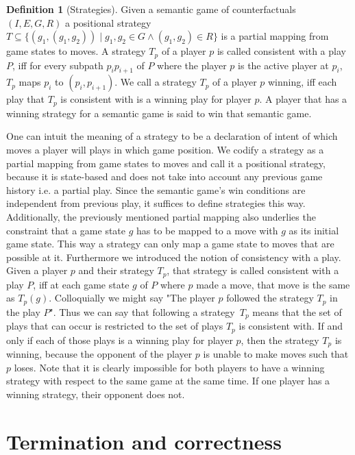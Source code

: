\documentclass[a4paper,american,10pt]{paper}
\theoremstyle{definition}\newtheorem{definition}{Definition}
\begin{document}
\begin{definition}[Strategies]
Given a semantic game of counterfactuals $(I, E, G, R)$ a positional strategy $T\subseteq\{(g_1,(g_1,g_2))\mid g_1,g_2\in G\wedge (g_1,g_2)\in R\}$ is a partial mapping from game states to moves. A strategy $T_p$ of a player $p$ is called consistent with a play $P$, iff for every subpath $p_ip_{i+1}$ of $P$ where the player $p$ is the active player at $p_i$, $T_p$ maps $p_i$ to $(p_i,p_{i+1})$. We call a strategy $T_p$ of a player $p$ winning, iff each play that $T_p$ is consistent with is a winning play for player $p$. A player that has a winning strategy for a semantic game is said to win that semantic game.
\end{definition}
One can intuit the meaning of a strategy to be a declaration of intent of which moves a player will plays in which game position. We codify a strategy as a partial mapping from game states to moves and call it a positional strategy, because it is state-based and does not take into account any previous game history i.e. a partial play. Since the semantic game's win conditions are independent from previous play, it suffices to define strategies this way. Additionally, the previously mentioned partial mapping also underlies the constraint that a game state $g$ has to be mapped to a move with $g$ as its initial game state. This way a strategy can only map a game state to moves that are possible at it. Furthermore we introduced the notion of consistency with a play. Given a player $p$ and their strategy $T_p$, that strategy is called consistent with a play $P$, iff at each game state $g$ of $P$ where $p$ made a move, that move is the same as $T_p(g)$. Colloquially we might say "The player $p$ followed the strategy $T_p$ in the play $P$". Thus we can say that following a strategy~$T_p$ means that the set of plays that can occur is restricted to the set of plays $T_p$ is consistent with. If and only if each of those plays is a winning play for player $p$, then the strategy $T_p$ is winning, because the opponent of the player $p$ is unable to make moves such that $p$ loses. Note that it is clearly impossible for both players to have a winning strategy with respect to the same game at the same time. If one player has a winning strategy, their opponent does not.
\section{Termination and correctness}\label{sec:proofs}
\end{document}
